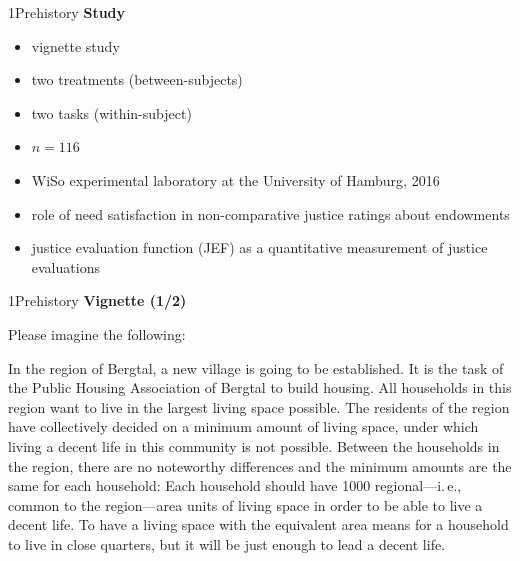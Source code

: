 \documentclass[xcolor=table,9pt,aspectratio=169]{beamer}
\begin{document}
\begin{frame}{\vspace*{10mm}1\hspace*{1em}Prehistory}
   \textbf{Study}
   
   \medskip
   \begin{itemize}
      \item vignette study
      \item two treatments (between-subjects)
      \item two tasks (within-subject)
      \item $n=116$
      \item WiSo experimental laboratory at the University of Hamburg, 2016
      \item role of need satisfaction in non-comparative justice ratings about endowments
      \item justice evaluation function (JEF) as a quantitative measurement of justice evaluations
   \end{itemize}
\end{frame}


\begin{frame}{\vspace*{10mm}1\hspace*{1em}Prehistory}
   \textbf{Vignette (1/2)}
   
   \medskip
   Please imagine the following:
   
   \medskip
   In the region of Bergtal, a new village is going to be established.
   It is the task of the Public Housing Association of Bergtal to build housing.
   All households in this region want to live in the largest living space possible.
   \textcolor{blue1}{The residents of the region have collectively decided on a minimum amount of living space, under which living a decent life in this community is not possible.}
   Between the households in the region, there are no noteworthy differences \textcolor{blue1}{and the minimum amounts are the same for each household:
   Each household should have 1000 regional---i.\,e., common to the region---area units of living space in order to be able to live a decent life.
   To have a living space with the equivalent area means for a household to live in close quarters, but it will be just enough to lead a decent life}.
\end{frame}
\end{document}
